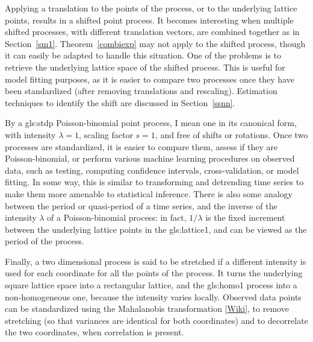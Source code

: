 \documentclass[10pt]{article}
\begin{document}
Applying a translation to the points of the process, or to the underlying lattice points, results in a \textcolor{index}{shifted point process}. It becomes interesting when multiple shifted processes, with different translation vectors, are combined together as in Section~\ref{sm1}. Theorem~\ref{combiexp} may not apply to the shifted process, though it can easily be adapted to handle this situation. One of the problems is to retrieve the underlying lattice space of the shifted process. This is useful for model fitting purposes, as it is easier to compare two processes once they have been standardized (after removing translations and rescaling). Estimation techniques to identify the shift are discussed in Section~\ref{ssnn}.

By a
\gls{gls:stdp}  Poisson-binomial point process,
 I mean one in its canonical form, with intensity $\lambda=1$, scaling factor $s=1$, and free of shifts or rotations.  Once two processes are standardized, it is easier to compare them, assess if they are Poisson-binomial, or perform various machine learning procedures on observed data, such as testing, computing confidence intervals, cross-validation, or model fitting. In some way, this is similar to transforming and detrending time series to make them more amenable to statistical inference. There is also some analogy between the period or quasi-period of a time series, and the inverse of the intensity $\lambda$ of a Poisson-binomial process: in fact, $1/\lambda$ is the fixed increment between the underlying lattice points in the
\gls{gls:lattice1}, %
 and can be viewed as the period of the process.

Finally, a two dimensional process is said to be \textcolor{index}{stretched} if a different intensity is used for each coordinate for all the points of the process. It turns the underlying square lattice space into a rectangular lattice, and the \gls{gls:homo1} process into a non-homogeneous one, because the intensity varies  locally. Observed data points can be standardized using the
\textcolor{index}{Mahalanobis transformation} [\href{https://en.wikipedia.org/wiki/Mahalanobis_distance}{Wiki}], to remove stretching (so that variances are identical for both coordinates) and to decorrelate the two coordinates, when correlation is present.
\end{document}
